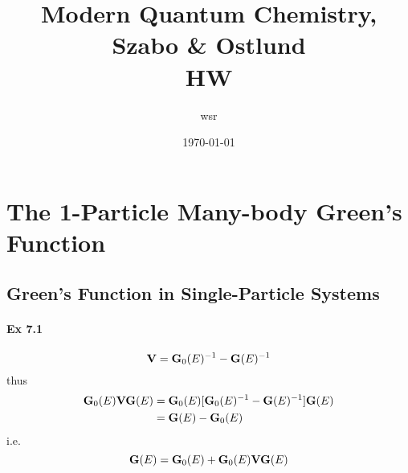 \documentclass[a4paper]{article}
\title{\textbf{Modern Quantum Chemistry, Szabo \& Ostlund}\\HW}
\author{wsr
\vspace{5pt}\\
}
\date{\today} %
\newcommand{\ex}[1]{\paragraph{Ex #1}}
\numberwithin{equation}{subsection}
\begin{document}

\maketitle

\tableofcontents

\newpage

\setcounter{section}{6}

\section{The 1-Particle Many-body Green's Function}
\subsection{Green's Function in Single-Particle Systems}
\ex{7.1}
\begin{equation}\label{key}
\vb{V} = \vb{G}_0(E)^{-1} - \vb{G}(E)^{-1}
\end{equation}
thus
\begin{align}
\vb{G}_0(E)\vb{V}\vb{G}(E) 
&= \vb{G}_0(E) [\vb{G}_0(E)^{-1} - \vb{G}(E)^{-1}] \vb{G}(E) \notag\\
&= \vb{G}(E) - \vb{G}_0(E)
\end{align}
i.e.
\begin{equation}\label{key}
\vb{G}(E) = \vb{G}_0(E) + \vb{G}_0(E)\vb{V}\vb{G}(E) 
\end{equation}
\end{document}
